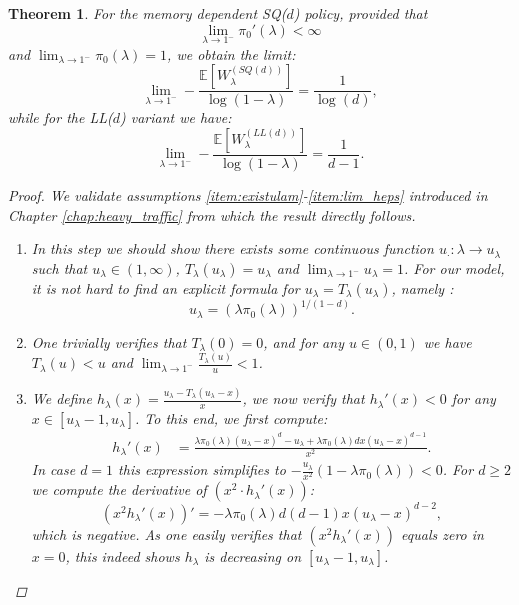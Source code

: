 \documentclass[12pt]{report}
\newcommand{\E}{\mathbb{E}}
\newtheorem{theorem}{Theorem}
\begin{document}
\begin{theorem} \label{thm:heavy_traffic_mem_Dpi0_finite}
For the memory dependent SQ($d$) policy, provided that 
$$
\lim_{\lambda \rightarrow 1^-} \pi_0'(\lambda) < \infty
$$
and $\lim_{\lambda \rightarrow 1^-} \pi_0(\lambda)=1$, we obtain the limit:
\begin{equation}\label{eq:heavy_traffic_mem_SQd}
\lim_{\lambda \rightarrow 1^-} -\frac{\E[W_\lambda^{(SQ(d))}]}{\log(1-\lambda)}=\frac{1}{\log(d)},
\end{equation}
while for the LL($d$) variant we have:
\begin{equation}\label{eq:heavy_traffic_mem_SQd}
\lim_{\lambda \rightarrow 1^-} -\frac{\E[W_\lambda^{(LL(d))}]}{\log(1-\lambda)}=\frac{1}{d-1}.
\end{equation}
\begin{proof}
We validate assumptions \ref{item:existulam}-\ref{item:lim_heps} introduced in Chapter \ref{chap:heavy_traffic} from which the result directly follows.
\begin{enumerate}[label=(\alph*), leftmargin=*]
\item In this step we should show there exists some continuous function $u_{\cdot} : \lambda \rightarrow u_\lambda$ such that $u_\lambda \in (1,\infty)$, $T_\lambda(u_\lambda)= u_{\lambda}$ and $\lim_{\lambda \rightarrow 1^-} u_\lambda = 1$. For our model, it is not hard to find an explicit formula for $u_\lambda=T_\lambda(u_\lambda)$, namely :
$$
u_\lambda=(\lambda \pi_0(\lambda))^{1/(1-d)}.
$$
\item One trivially verifies that $T_\lambda(0)=0$, and for any $u\in (0,1)$ we have $T_\lambda(u) < u$ and $\lim_{\lambda \rightarrow 1^-} \frac{T_\lambda(u)}{u} < 1$.
\item We define $h_\lambda(x) = \frac{u_\lambda-T_\lambda(u_\lambda-x)}{x}$, we now verify that $h_\lambda'(x) < 0$ for any $x\in [u_\lambda-1, u_\lambda]$. To this end, we first compute:
\begin{align*}
h_\lambda'(x)
&= \frac{\lambda \pi_0(\lambda) (u_\lambda - x)^d - u_\lambda + \lambda \pi_0(\lambda) d x (u_\lambda - x)^{d-1}}{x^2}.
\end{align*}
In case $d=1$ this expression simplifies to $-\frac{u_\lambda}{x^2} (1-\lambda \pi_0(\lambda)) < 0$. For $d\geq 2$ we compute the derivative of $(x^2 \cdot h_\lambda'(x))$:
$$
(x^2 h_\lambda'(x))' = - \lambda \pi_0(\lambda) d (d-1) x (u_\lambda - x)^{d-2},
$$
which is negative. As one easily verifies that $(x^2 h_\lambda'(x))$ equals zero in $x=0$, this indeed shows $h_\lambda$ is decreasing on $[u_\lambda-1, u_\lambda]$.

\end{enumerate}
\end{proof}
\end{theorem}
\end{document}
